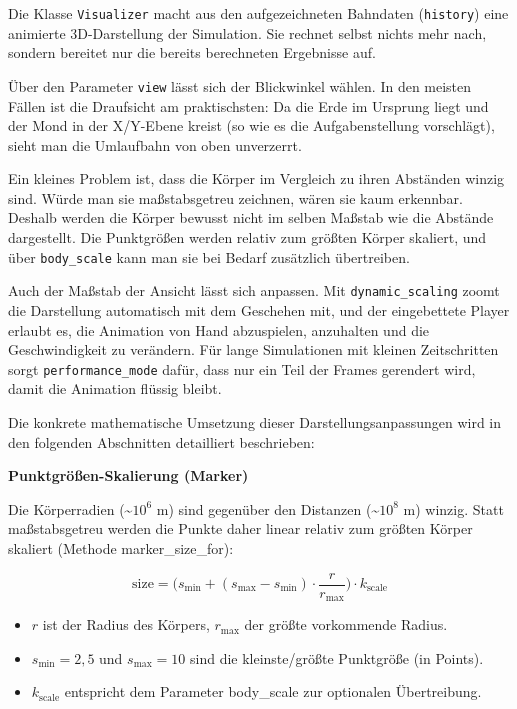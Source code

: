 \documentclass[11pt]{article}
\providecommand{\tightlist}{%
      \setlength{\itemsep}{0pt}\setlength{\parskip}{0pt}}
\begin{document}
    Die Klasse \texttt{Visualizer} macht aus den aufgezeichneten Bahndaten
(\texttt{history}) eine animierte 3D-Darstellung der Simulation. Sie
rechnet selbst nichts mehr nach, sondern bereitet nur die bereits
berechneten Ergebnisse auf.

Über den Parameter \texttt{view} lässt sich der Blickwinkel wählen. In
den meisten Fällen ist die Draufsicht am praktischsten: Da die Erde im
Ursprung liegt und der Mond in der X/Y-Ebene kreist (so wie es die
Aufgabenstellung vorschlägt), sieht man die Umlaufbahn von oben
unverzerrt.

Ein kleines Problem ist, dass die Körper im Vergleich zu ihren Abständen
winzig sind. Würde man sie maßstabsgetreu zeichnen, wären sie kaum
erkennbar. Deshalb werden die Körper bewusst nicht im selben Maßstab wie
die Abstände dargestellt. Die Punktgrößen werden relativ zum größten
Körper skaliert, und über \texttt{body\_scale} kann man sie bei Bedarf
zusätzlich übertreiben.

Auch der Maßstab der Ansicht lässt sich anpassen. Mit
\texttt{dynamic\_scaling} zoomt die Darstellung automatisch mit dem
Geschehen mit, und der eingebettete Player erlaubt es, die Animation von
Hand abzuspielen, anzuhalten und die Geschwindigkeit zu verändern. Für
lange Simulationen mit kleinen Zeitschritten sorgt
\texttt{performance\_mode} dafür, dass nur ein Teil der Frames gerendert
wird, damit die Animation flüssig bleibt.

Die konkrete mathematische Umsetzung dieser Darstellungsanpassungen wird
in den folgenden Abschnitten detailliert beschrieben:

\textbf{Punktgrößen-Skalierung (Marker)}

Die Körperradien (\textasciitilde{}\(10^6\) m) sind gegenüber den
Distanzen (\textasciitilde{}\(10^8\) m) winzig. Statt maßstabsgetreu
werden die Punkte daher linear relativ zum größten Körper skaliert
(Methode marker\_size\_for):

\[
\text{size} = \Big( s_{\min} + (s_{\max}-s_{\min})\cdot \frac{r}{r_{\max}} \Big)\cdot k_{\text{scale}}
\]

\begin{itemize}
\tightlist
\item
  \(r\) ist der Radius des Körpers, \(r_{\max}\) der größte vorkommende
  Radius.
\item
  \(s_{\min}=2{,}5\) und \(s_{\max}=10\) sind die kleinste/größte
  Punktgröße (in Points).
\item
  \(k_{\text{scale}}\) entspricht dem Parameter body\_scale zur
  optionalen Übertreibung.
\end{itemize}
\end{document}
